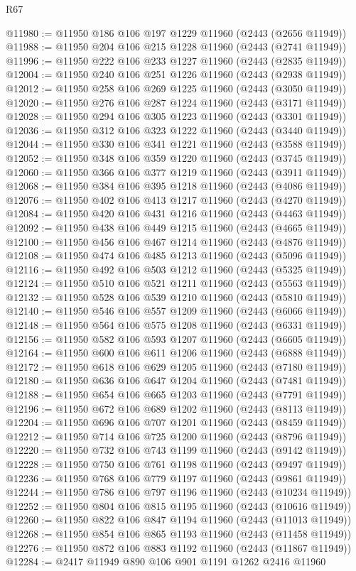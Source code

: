 \begin{lexlean}{R67}
\begin{coremodule}
@11980 := @11950 @186 @106 @197 @1229 @11960 (@2443 (@2656 @11949))
@11988 := @11950 @204 @106 @215 @1228 @11960 (@2443 (@2741 @11949))
@11996 := @11950 @222 @106 @233 @1227 @11960 (@2443 (@2835 @11949))
@12004 := @11950 @240 @106 @251 @1226 @11960 (@2443 (@2938 @11949))
@12012 := @11950 @258 @106 @269 @1225 @11960 (@2443 (@3050 @11949))
@12020 := @11950 @276 @106 @287 @1224 @11960 (@2443 (@3171 @11949))
@12028 := @11950 @294 @106 @305 @1223 @11960 (@2443 (@3301 @11949))
@12036 := @11950 @312 @106 @323 @1222 @11960 (@2443 (@3440 @11949))
@12044 := @11950 @330 @106 @341 @1221 @11960 (@2443 (@3588 @11949))
@12052 := @11950 @348 @106 @359 @1220 @11960 (@2443 (@3745 @11949))
@12060 := @11950 @366 @106 @377 @1219 @11960 (@2443 (@3911 @11949))
@12068 := @11950 @384 @106 @395 @1218 @11960 (@2443 (@4086 @11949))
@12076 := @11950 @402 @106 @413 @1217 @11960 (@2443 (@4270 @11949))
@12084 := @11950 @420 @106 @431 @1216 @11960 (@2443 (@4463 @11949))
@12092 := @11950 @438 @106 @449 @1215 @11960 (@2443 (@4665 @11949))
@12100 := @11950 @456 @106 @467 @1214 @11960 (@2443 (@4876 @11949))
@12108 := @11950 @474 @106 @485 @1213 @11960 (@2443 (@5096 @11949))
@12116 := @11950 @492 @106 @503 @1212 @11960 (@2443 (@5325 @11949))
@12124 := @11950 @510 @106 @521 @1211 @11960 (@2443 (@5563 @11949))
@12132 := @11950 @528 @106 @539 @1210 @11960 (@2443 (@5810 @11949))
@12140 := @11950 @546 @106 @557 @1209 @11960 (@2443 (@6066 @11949))
@12148 := @11950 @564 @106 @575 @1208 @11960 (@2443 (@6331 @11949))
@12156 := @11950 @582 @106 @593 @1207 @11960 (@2443 (@6605 @11949))
@12164 := @11950 @600 @106 @611 @1206 @11960 (@2443 (@6888 @11949))
@12172 := @11950 @618 @106 @629 @1205 @11960 (@2443 (@7180 @11949))
@12180 := @11950 @636 @106 @647 @1204 @11960 (@2443 (@7481 @11949))
@12188 := @11950 @654 @106 @665 @1203 @11960 (@2443 (@7791 @11949))
@12196 := @11950 @672 @106 @689 @1202 @11960 (@2443 (@8113 @11949))
@12204 := @11950 @696 @106 @707 @1201 @11960 (@2443 (@8459 @11949))
@12212 := @11950 @714 @106 @725 @1200 @11960 (@2443 (@8796 @11949))
@12220 := @11950 @732 @106 @743 @1199 @11960 (@2443 (@9142 @11949))
@12228 := @11950 @750 @106 @761 @1198 @11960 (@2443 (@9497 @11949))
@12236 := @11950 @768 @106 @779 @1197 @11960 (@2443 (@9861 @11949))
@12244 := @11950 @786 @106 @797 @1196 @11960 (@2443 (@10234 @11949))
@12252 := @11950 @804 @106 @815 @1195 @11960 (@2443 (@10616 @11949))
@12260 := @11950 @822 @106 @847 @1194 @11960 (@2443 (@11013 @11949))
@12268 := @11950 @854 @106 @865 @1193 @11960 (@2443 (@11458 @11949))
@12276 := @11950 @872 @106 @883 @1192 @11960 (@2443 (@11867 @11949))
@12284 := @2417 @11949 @890 @106 @901 @1191 @1262 @2416 @11960

\end{coremodule}
\end{lexlean}
